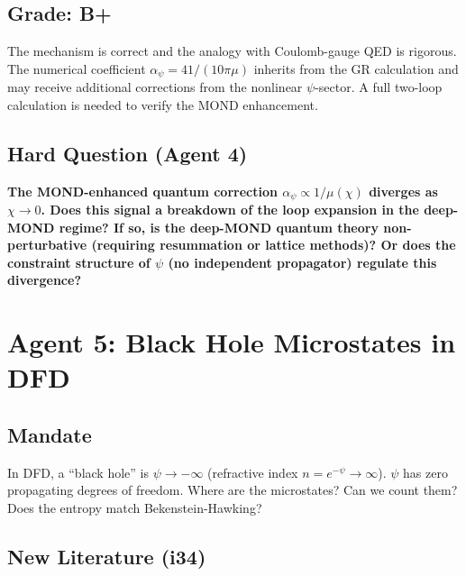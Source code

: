 \documentclass[11pt,a4paper]{article}
\begin{document}
\subsection{Grade: B+}

The mechanism is correct and the analogy with Coulomb-gauge QED is rigorous. The numerical coefficient $\alpha_\psi = 41/(10\pi\mu)$ inherits from the GR calculation and may receive additional corrections from the nonlinear $\psi$-sector. A full two-loop calculation is needed to verify the MOND enhancement.

\subsection{Hard Question (Agent 4)}

\textbf{The MOND-enhanced quantum correction $\alpha_\psi \propto 1/\mu(\chi)$ diverges as $\chi \to 0$. Does this signal a breakdown of the loop expansion in the deep-MOND regime? If so, is the deep-MOND quantum theory non-perturbative (requiring resummation or lattice methods)? Or does the constraint structure of $\psi$ (no independent propagator) regulate this divergence?}

\newpage

\section{Agent 5: Black Hole Microstates in DFD}
\label{sec:agent5}

\subsection{Mandate}

In DFD, a ``black hole'' is $\psi \to -\infty$ (refractive index $n = e^{-\psi} \to \infty$). $\psi$ has zero propagating degrees of freedom. Where are the microstates? Can we count them? Does the entropy match Bekenstein-Hawking?

\subsection{New Literature (i34)}
\end{document}
